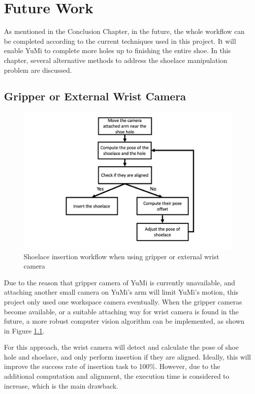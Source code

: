 \chapter{Future Work}
As mentioned in the Conclusion Chapter, in the future, the whole workflow can be completed according to the current techniques used in this project. It will enable YuMi to complete more holes up to finishing the entire shoe. In this chapter, several alternative methods to address the shoelace manipulation problem are discussed. 


\section{Gripper or External Wrist Camera} \label{futurecamera}

\begin{figure}[H]
\centering
\includegraphics[width = 0.8\columnwidth]{Futurework/feedbackcamera.png}
\caption{Shoelace insertion workflow when using gripper or external wrist camera}
\label{feedbackcamera}
\end{figure}
Due to the reason that gripper camera of YuMi is currently unavailable, and attaching another small camera on YuMi's arm will limit YuMi's motion, this project only used one workspace camera eventually. When the gripper cameras become available, or a suitable attaching way for wrist camera is found in the future, a more robust computer vision algorithm can be implemented, as shown in Figure \ref{feedbackcamera}.

For this approach, the wrist camera will detect and calculate the pose of shoe hole and shoelace, and only perform insertion if they are aligned. Ideally, this will improve the success rate of insertion task to 100\%. However, due to the additional computation and alignment, the execution time is considered to increase, which is the main drawback. 

